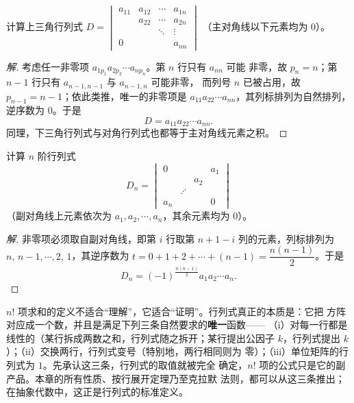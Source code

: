 \begin{example}\label{ex:upper-tri}
计算上三角行列式
$D=\begin{vmatrix} a_{11} & a_{12} & \cdots & a_{1n} \\ & a_{22} & \cdots & a_{2n} \\ & & \ddots & \vdots \\ 0 & & & a_{nn} \end{vmatrix}$
（主对角线以下元素均为 $0$）。
\end{example}
\begin{proof}[解]
考虑任一非零项 $a_{1p_1}a_{2p_2}\cdots a_{np_n}$。第 $n$ 行只有 $a_{nn}$ 可能
非零，故 $p_n=n$；第 $n-1$ 行只有 $a_{n-1,n-1}$ 与 $a_{n-1,n}$ 可能非零，
而列号 $n$ 已被占用，故 $p_{n-1}=n-1$；依此类推，唯一的非零项是
$a_{11}a_{22}\cdots a_{nn}$，其列标排列为自然排列，逆序数为 $0$。于是
\[
  D=a_{11}a_{22}\cdots a_{nn}.
\]
同理，下三角行列式与对角行列式也都等于主对角线元素之积。
\end{proof}

\begin{example}\label{ex:anti-diagonal}
计算 $n$ 阶行列式
\[
  D_n=\begin{vmatrix}
        0      &        &        & a_{1} \\
               &        & a_{2}  & \\
               & \iddots&        & \\
        a_{n}  &        &        & 0
      \end{vmatrix}
\]
（副对角线上元素依次为 $a_1,a_2,\cdots,a_n$，其余元素均为 $0$）。
\end{example}
\begin{proof}[解]
非零项必须取自副对角线，即第 $i$ 行取第 $n+1-i$ 列的元素，列标排列为
$n,\,n-1,\cdots,2,\,1$，其逆序数为
$t=0+1+2+\cdots+(n-1)=\dfrac{n(n-1)}{2}$。于是
\[
  D_n=(-1)^{\frac{n(n-1)}{2}}a_1a_2\cdots a_n .
\]
\end{proof}

\begin{insight}[本质：用三条要求刻画行列式]
$n!$ 项求和的定义不适合“理解”，它适合“证明”。行列式真正的本质是：它把
方阵对应成一个数，并且是满足下列三条自然要求的\textbf{唯一}函数——
（i）对每一行都是线性的（某行拆成两数之和，行列式随之拆开；某行提出公因子
$k$，行列式提出 $k$）；（ii）交换两行，行列式变号（特别地，两行相同则为
零）；（iii）单位矩阵的行列式为 $1$。先承认这三条，行列式的取值就被完全
确定，$n!$ 项的公式只是它的副产品。本章的所有性质、按行展开定理乃至克拉默
法则，都可以从这三条推出；在抽象代数中，这正是行列式的标准定义。
\end{insight}

